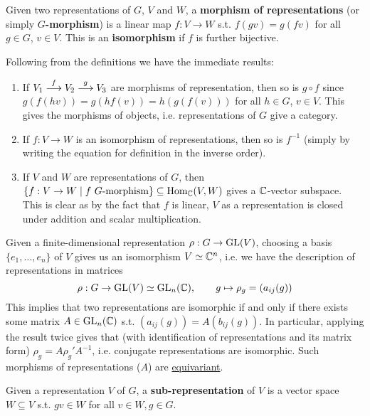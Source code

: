 \documentclass{article}
\begin{document}
\begin{definition}
    Given two representations of $G$, $V$ and $W$, a \textbf{morphism of representations} (or simply \textbf{$G$-morphism}) is a linear map $f: V \to W$ s.t. $f(gv) = g(fv)$ for all $g \in G$, $v \in V$. This is an \textbf{isomorphism} if $f$ is further bijective.  
\end{definition}

\begin{remark}
    Following from the definitions we have the immediate results:
    \begin{enumerate}[label=\arabic*)]
        \item If $V_1 \overset{f}{\longrightarrow} V_2 \overset{g}{\longrightarrow} V_3$ are morphisms of representation, then so is $g \circ f$ since $g(f(hv)) = g(hf(v)) = h(g(f(v)))$ for all $h \in G$, $v \in V$. This gives the morphisms of objects, i.e. representations of $G$ give a category.
        \item If $f: V \to W$ is an isomorphism of representations, then so is $f^{-1}$ (simply by writing the equation for definition in the inverse order).
        \item If $V$ and $W$ are representations of $G$, then $\{ f : V \to W \mid f \text{ $G$-morphism} \} \subseteq \mathrm{Hom}_{\mathbb{C}}(V, W)$ gives a $\mathbb{C}$-vector subspace. This is clear as by the fact that $f$ is linear, $V$ as a representation is closed under addition and scalar multiplication.
    \end{enumerate}
\end{remark}

\begin{remark}
    Given a finite-dimensional representation $\rho: G \to \mathrm{GL}(V)$, choosing a basis $\{e_1, \dots, e_n\}$ of $V$ gives us an isomorphism $V \simeq \mathbb{C}^n$, i.e. we have the description of representations in matrices
    \[
        \rho: G \to \mathrm{GL}(V) \simeq \mathrm{GL}_n(\mathbb{C}), \qquad g \mapsto \rho_g = (a_{ij}(g))
    \]
    This implies that two representations are isomorphic if and only if there exists some matrix $A \in \mathrm{GL}_n(\mathbb{C})$ s.t. $(a_{ij}(g)) = A (b_{ij}(g))$. In particular, applying the result twice gives that (with identification of representations and its matrix form) $\rho_g = A \rho_g' A^{-1}$, i.e. conjugate representations are isomorphic. Such morphisms of representations ($A$) are \underline{equivariant}.
\end{remark}

\begin{definition}
    Given a representation $V$ of $G$, a \textbf{sub-representation} of $V$ is a vector space $W \subseteq V$ s.t. $gv \in W$ for all $v \in W, g \in G$. 
\end{definition}
\end{document}
